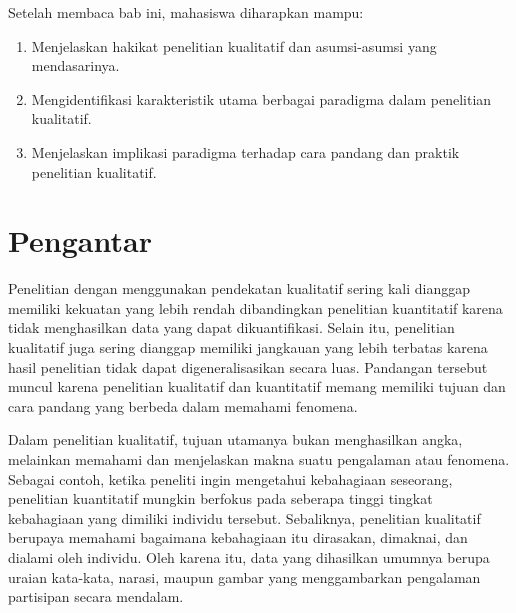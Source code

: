\documentclass[
  indonesian,
  letterpaper,
  DIV=11,
  numbers=noendperiod]{scrreprt}
\providecommand{\tightlist}{%
  \setlength{\itemsep}{0pt}\setlength{\parskip}{0pt}}
\begin{document}
\begin{tcolorbox}[enhanced jigsaw, colframe=quarto-callout-note-color-frame, toptitle=1mm, breakable, leftrule=.75mm, arc=.35mm, toprule=.15mm, colback=white, colbacktitle=quarto-callout-note-color!10!white, bottomtitle=1mm, bottomrule=.15mm, titlerule=0mm, title=\textcolor{quarto-callout-note-color}{\faInfo}\hspace{0.5em}{Capaian Pembelajaran}, coltitle=black, left=2mm, opacitybacktitle=0.6, opacityback=0, rightrule=.15mm]

Setelah membaca bab ini, mahasiswa diharapkan mampu:

\begin{enumerate}
\def\labelenumi{\arabic{enumi}.}
\tightlist
\item
  Menjelaskan hakikat penelitian kualitatif dan asumsi-asumsi yang
  mendasarinya.
\item
  Mengidentifikasi karakteristik utama berbagai paradigma dalam
  penelitian kualitatif.
\item
  Menjelaskan implikasi paradigma terhadap cara pandang dan praktik
  penelitian kualitatif.
\end{enumerate}

\end{tcolorbox}

\section{Pengantar}\label{pengantar}

Penelitian dengan menggunakan pendekatan kualitatif sering kali dianggap
memiliki kekuatan yang lebih rendah dibandingkan penelitian kuantitatif
karena tidak menghasilkan data yang dapat dikuantifikasi. Selain itu,
penelitian kualitatif juga sering dianggap memiliki jangkauan yang lebih
terbatas karena hasil penelitian tidak dapat digeneralisasikan secara
luas. Pandangan tersebut muncul karena penelitian kualitatif dan
kuantitatif memang memiliki tujuan dan cara pandang yang berbeda dalam
memahami fenomena.

Dalam penelitian kualitatif, tujuan utamanya bukan menghasilkan angka,
melainkan memahami dan menjelaskan makna suatu pengalaman atau fenomena.
Sebagai contoh, ketika peneliti ingin mengetahui kebahagiaan seseorang,
penelitian kuantitatif mungkin berfokus pada seberapa tinggi tingkat
kebahagiaan yang dimiliki individu tersebut. Sebaliknya, penelitian
kualitatif berupaya memahami bagaimana kebahagiaan itu dirasakan,
dimaknai, dan dialami oleh individu. Oleh karena itu, data yang
dihasilkan umumnya berupa uraian kata-kata, narasi, maupun gambar yang
menggambarkan pengalaman partisipan secara mendalam.
\end{document}
